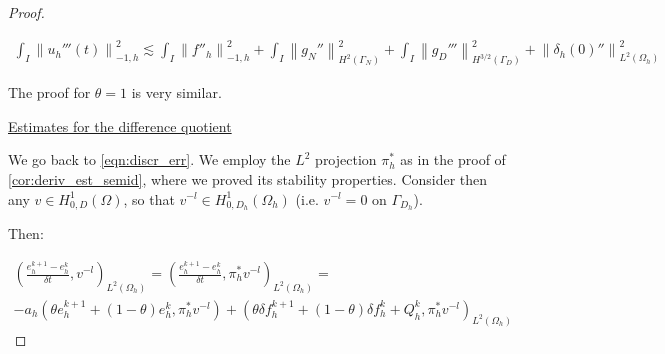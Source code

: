\documentclass[english,a4paper,9pt,oneside]{scrbook}	%
\theoremstyle{break}
\newenvironment{mproof}[1][\proofname]{%
  \begin{proof}[#1]$ $\par\nobreak\ignorespaces
}{%
  \end{proof}
}
\renewcommand*{\proofname}{Proof}
\theoremstyle{remark}
\newcommand{\norm}[1]{\left\lVert#1\right\rVert}
\begin{document}
\begin{appendices}
\begin{mproof}
\begin{align*}
	\int_I \norm{u_h'''(t)}_{-1,h}^2\lesssim \int_I \norm{f''_h}_{-1,h}^2+\int_I\norm{ g_{N}''}_{H^{2}(\Gamma_{N})}^2 + \int_I\norm{g_D'''}_{H^{3/2}(\Gamma_D)}^2 + \norm{\delta_{h}(0)''}_{L^2(\Omega_h)}^2
\end{align*}


The proof for $\theta=1$ is very similar.

%
%
%
%
%
%
%

\underline{Estimates for the difference quotient}

We go back to \cref{eqn:discr_err}.  We employ the $L^2$ projection $\pi_h^*$ as in the proof of \cref{cor:deriv_est_semid}, where we proved its stability properties. Consider then any $v \in H^1_{0,D}(\Omega)$, so that $v^{-l} \in H^1_{0,D_h}(\Omega_h)$ (i.e. $v^{-l}=0$ on $\Gamma_{D_h}$).

Then:

\begin{align}
\label{eqn:der_err_eqn}
\left ( \frac{e_{h}^{k+1}-e_h^k}{\delta t}, v^{-l}\right)_{L^2(\Omega_h)} = \left ( \frac{e_{h}^{k+1}-e_h^k}{\delta t}, \pi_h^* v^{-l}\right)_{L^2(\Omega_h)} =  \\- a_h(\theta e_h^{k+1}+(1-\theta)e^k_h, \pi_h^* v^{-l}) + (\theta \delta f_h^{k+1}+(1-\theta)\delta f_h^k + Q_h^k, \pi_h^* v^{-l})_{L^2(\Omega_h)}
\end{align}


\end{mproof}
\end{appendices}
\end{document}
